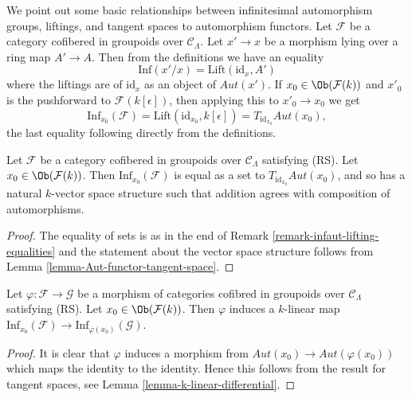 \begin{remark}
\label{remark-infaut-lifting-equalities}
We point out some basic relationships between infinitesimal automorphism
groups, liftings, and tangent spaces to automorphism functors. Let
$\mathcal{F}$ be a category cofibered in groupoids over $\mathcal{C}_\Lambda$.
Let $x' \to x$ be a morphism lying over a ring map $A' \to A$.
Then from the definitions we have an equality
$$
\text{Inf}(x'/x) = \text{Lift}(\text{id}_x, A')
$$
where the liftings are of $\text{id}_x$ as an object of
$\mathit{Aut}(x')$.  If $x_0 \in \Ob(\mathcal{F}(k))$ and $x'_0$
is the pushforward to $\mathcal{F}(k[\epsilon])$, then applying this to
$x'_0 \to x_0$ we get
$$
\text{Inf}_{x_0}(\mathcal{F}) =
\text{Lift}(\text{id}_{x_0}, k[\epsilon]) =
T_{\text{id}_{x_0}} \mathit{Aut}(x_0),
$$
the last equality following directly from the definitions.
\end{remark}

\begin{lemma}
\label{lemma-infaut-vector-space}
Let $\mathcal{F}$ be a category cofibered in groupoids over
$\mathcal{C}_\Lambda$ satisfying (RS). Let $x_0 \in \Ob(\mathcal{F}(k))$.
Then $\text{Inf}_{x_0}(\mathcal{F})$ is equal as a set to
$T_{\text{id}_{x_0}} \mathit{Aut}(x_0)$, and so has a natural $k$-vector
space structure such that addition agrees with composition of automorphisms.
\end{lemma}

\begin{proof}
The equality of sets is as in the end of
Remark \ref{remark-infaut-lifting-equalities}
and the statement about the vector space structure follows from
Lemma \ref{lemma-Aut-functor-tangent-space}.
\end{proof}

\begin{lemma}
\label{lemma-k-linear-infaut}
Let $\varphi : \mathcal{F} \to \mathcal{G}$ be a morphism of categories
cofibred in groupoids over $\mathcal{C}_\Lambda$ satisfying (RS).
Let $x_0 \in \Ob(\mathcal{F}(k))$. Then $\varphi$ induces a $k$-linear
map $\text{Inf}_{x_0}(\mathcal{F}) \to \text{Inf}_{\varphi(x_0)}(\mathcal{G})$.
\end{lemma}

\begin{proof}
It is clear that $\varphi$ induces a morphism from
$\mathit{Aut}(x_0) \to \mathit{Aut}(\varphi(x_0))$
which maps the identity to the identity. Hence this follows from
the result for tangent spaces, see
Lemma \ref{lemma-k-linear-differential}.
\end{proof}

